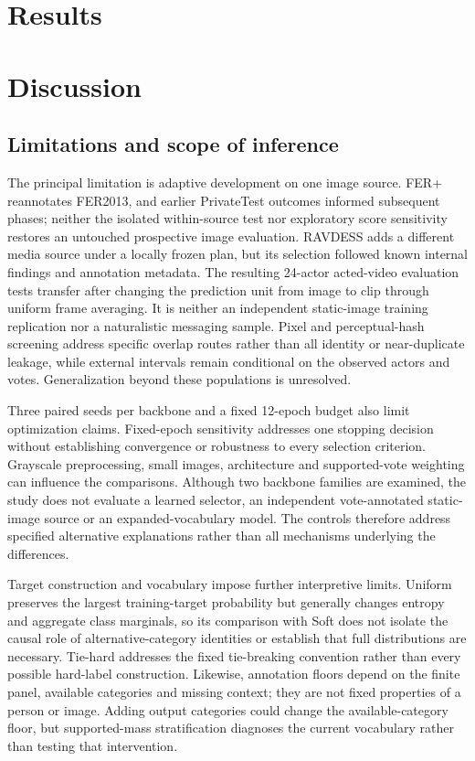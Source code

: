 \documentclass[pdflatex,sn-mathphys-num]{sn-jnl}
\begin{document}
\FloatBarrier
{}
\section{Results}


\FloatBarrier
\section{Discussion}


\subsection{Limitations and scope of inference}
The principal limitation is adaptive development on one image source. FER+ reannotates FER2013, and earlier PrivateTest outcomes informed subsequent phases; neither the isolated within-source test nor exploratory score sensitivity restores an untouched prospective image evaluation. RAVDESS adds a different media source under a locally frozen plan, but its selection followed known internal findings and annotation metadata. The resulting 24-actor acted-video evaluation tests transfer after changing the prediction unit from image to clip through uniform frame averaging. It is neither an independent static-image training replication nor a naturalistic messaging sample. Pixel and perceptual-hash screening address specific overlap routes rather than all identity or near-duplicate leakage, while external intervals remain conditional on the observed actors and votes. Generalization beyond these populations is unresolved.

Three paired seeds per backbone and a fixed 12-epoch budget also limit optimization claims. Fixed-epoch sensitivity addresses one stopping decision without establishing convergence or robustness to every selection criterion. Grayscale preprocessing, small images, architecture and supported-vote weighting can influence the comparisons. Although two backbone families are examined, the study does not evaluate a learned selector, an independent vote-annotated static-image source or an expanded-vocabulary model. The controls therefore address specified alternative explanations rather than all mechanisms underlying the differences.

Target construction and vocabulary impose further interpretive limits. Uniform preserves the largest training-target probability but generally changes entropy and aggregate class marginals, so its comparison with Soft does not isolate the causal role of alternative-category identities or establish that full distributions are necessary. Tie-hard addresses the fixed tie-breaking convention rather than every possible hard-label construction. Likewise, annotation floors depend on the finite panel, available categories and missing context; they are not fixed properties of a person or image. Adding output categories could change the available-category floor, but supported-mass stratification diagnoses the current vocabulary rather than testing that intervention.
\end{document}
